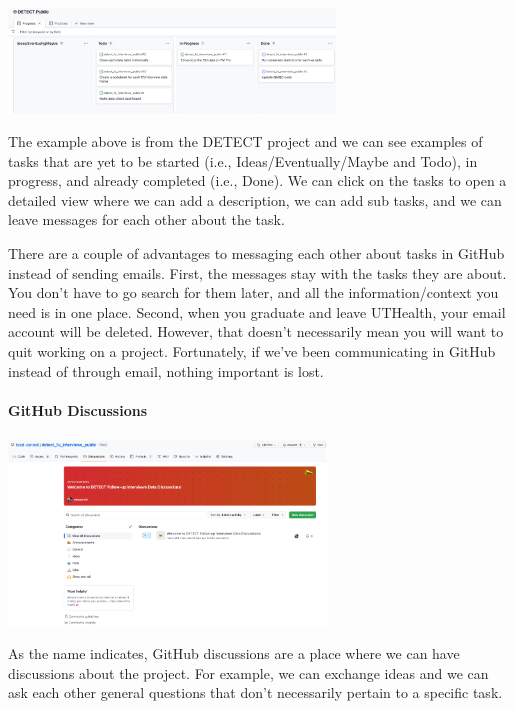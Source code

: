 \documentclass[
  letterpaper,
  DIV=11,
  numbers=noendperiod]{scrreprt}
\let\oldparagraph\paragraph
\renewcommand{\paragraph}[1]{\oldparagraph{#1}\mbox{}}
\begin{document}
\begin{center}
\includegraphics[width=3.42in,height=\textheight]{chapters/gra_tasks/../../graphics/project.png}
\end{center}

The example above is from the DETECT project and we can see examples of
tasks that are yet to be started (i.e., Ideas/Eventually/Maybe and
Todo), in progress, and already completed (i.e., Done). We can click on
the tasks to open a detailed view where we can add a description, we can
add sub tasks, and we can leave messages for each other about the task.

There are a couple of advantages to messaging each other about tasks in
GitHub instead of sending emails. First, the messages stay with the
tasks they are about. You don't have to go search for them later, and
all the information/context you need is in one place. Second, when you
graduate and leave UTHealth, your email account will be deleted.
However, that doesn't necessarily mean you will want to quit working on
a project. Fortunately, if we've been communicating in GitHub instead of
through email, nothing important is lost.

\paragraph{GitHub Discussions}\label{github-discussions}

\begin{center}
\includegraphics[width=3.32in,height=\textheight]{chapters/gra_tasks/../../graphics/discussions.png}
\end{center}

As the name indicates, GitHub discussions are a place where we can have
discussions about the project. For example, we can exchange ideas and we
can ask each other general questions that don't necessarily pertain to a
specific task.
\end{document}
